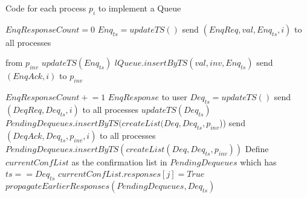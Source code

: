 \documentclass[a4paper,anonymous,USenglish]{lipics-v2021}
\theoremstyle{definition}
\newcommand{\pluseq}{\mathrel{+}=}
\begin{document}
\begin{algorithm}
  \caption{Code for each process $p_i$ to implement a Queue}\label{alg:fifo}
  \begin{algorithmic}[1]
    \label{fifoline:invEnq}
      \State $EnqResponseCount = 0$ 
      \State $Enq_{ts} = updateTS()$ \label{fifoline:enqTS} 
      \State send $(EnqReq, val, Enq_{ts}, i)$ to all processes\label{fifoline:sendEnqReq}
    \EndFunction

     from $p_{inv}$
      \State $updateTS(Enq_{ts})$ \label{fifoline:enqReqTSUpdate} 
      \State $lQueue.insertByTS(val, inv, Enq_{ts})$\label{fifoline:executeEnq} 
      \State send $(EnqAck, i)$ to $p_{inv}$ \label{fifoline:sendEnqAck} 
    \EndFunction

      \State $EnqResponseCount \pluseq 1$
        \Return $EnqResponse$ to user\label{fifoline:enqReturn} 
      \EndIf
    \EndFunction \label{fifoline:finishEnq}
%
      \State $Deq_{ts} = updateTS()$ \label{fifoline:deqTS}
      \State send $(DeqReq, Deq_{ts}, i)$ to all processes \label{fifoline:sendDeqReq}
    \EndFunction
%
    \State $updateTS(Deq_{ts})$ \label{fifoline:deqReqTSUpdate}
      \State $PendingDequeues.insertByTS(createList(Deq, Deq_{ts}, p_{inv}$))\label{fifoline:savePendingDeq}
      \EndIf
      \State send $(DeqAck, Deq_{ts}, p_{inv}, i)$ to all processes \label{fifoline:sendSafetyFlag}\label{fifoline:sendDeqAck}
    \EndFunction
%
        \State $PendingDequeues.insertByTS(createList(Deq, Deq_{ts},p_{inv}))$
      \EndIf
      \State Define $currentConfList$ as the confirmation list in $PendingDequeues$ which has $ts == Deq_{ts}$
      \State $currentConfList.responses[j] = True$ \label{fifoline:setResponse}
      \State $propagateEarlierResponses(PendingDequeues, Deq_{ts})$ \label{fifoline:propagateEarlier}


\end{algorithmic}
\end{algorithm}
\end{document}
